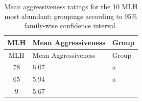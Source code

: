 \documentclass[fleqn,10pt,lineno]{wlpeerj} %
\theoremstyle{definition}
\theoremstyle{definition}
\theoremstyle{definition}
\theoremstyle{remark}
\begin{document}
\begin{longtable}[]{@{}cll@{}}
\caption{\label{tab:MLG-aggressiveness} Mean aggressiveness ratings for the
10 MLH most abundant; groupings according to 95\% family-wise confidence
interval.}\tabularnewline
\toprule
\begin{minipage}[b]{0.10\columnwidth}\centering\strut
MLH\strut
\end{minipage} & \begin{minipage}[b]{0.25\columnwidth}\raggedright\strut
Mean Aggressiveness\strut
\end{minipage} & \begin{minipage}[b]{0.08\columnwidth}\raggedright\strut
Group\strut
\end{minipage}\tabularnewline
\midrule
\endfirsthead
\toprule
\begin{minipage}[b]{0.10\columnwidth}\centering\strut
MLH\strut
\end{minipage} & \begin{minipage}[b]{0.25\columnwidth}\raggedright\strut
Mean Aggressiveness\strut
\end{minipage} & \begin{minipage}[b]{0.08\columnwidth}\raggedright\strut
Group\strut
\end{minipage}\tabularnewline
\midrule
\endhead
\begin{minipage}[t]{0.10\columnwidth}\centering\strut
78\strut
\end{minipage} & \begin{minipage}[t]{0.25\columnwidth}\raggedright\strut
6.07\strut
\end{minipage} & \begin{minipage}[t]{0.08\columnwidth}\raggedright\strut
a\strut
\end{minipage}\tabularnewline
\begin{minipage}[t]{0.10\columnwidth}\centering\strut
65\strut
\end{minipage} & \begin{minipage}[t]{0.25\columnwidth}\raggedright\strut
5.94\strut
\end{minipage} & \begin{minipage}[t]{0.08\columnwidth}\raggedright\strut
a\strut
\end{minipage}\tabularnewline
\begin{minipage}[t]{0.10\columnwidth}\centering\strut
9\strut
\end{minipage} & \begin{minipage}[t]{0.25\columnwidth}\raggedright\strut
5.67\strut

\end{minipage}
\end{longtable}
\end{document}
